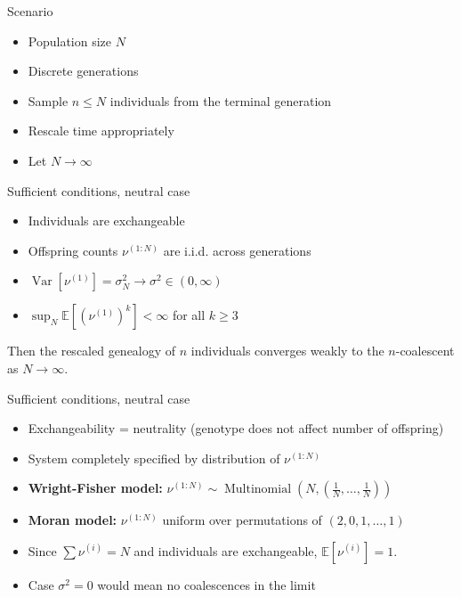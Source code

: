 \documentclass[aspectratio=169]{beamer}
\theoremstyle{definition}
\newcommand{\E}{\mathbb{E}}
\newcommand{\V}{\operatorname{Var}}
\newcommand{\Mn}{\operatorname{Multinomial}}
\begin{document}
\begin{frame}{Scenario}
\begin{itemize}
\item Population size $N$
\item Discrete generations
\item Sample $n \leq N$ individuals from the terminal generation
\item Rescale time appropriately
\item Let $N\to\infty$
\end{itemize}
\end{frame}


\begin{frame}{Sufficient conditions, neutral case}
\begin{theorem}[Kingman 1982]
\begin{itemize}
\item Individuals are exchangeable
\item Offspring counts $\nu^{(1:N)}$ are i.i.d. across generations
\item $\V[ \nu^{(1)} ] = \sigma_N^2 \longrightarrow \sigma^2 \in (0,\infty)$
\item $\sup_N \E[ (\nu^{(1)})^k] <\infty$ for all $k\geq 3$
\end{itemize}
Then the rescaled genealogy of $n$ individuals converges weakly to the $n$-coalescent as $N\to\infty$.
\end{theorem}
\end{frame}


\begin{frame}{Sufficient conditions, neutral case}
\begin{itemize}
\item Exchangeability = neutrality (genotype does not affect number of offspring)
\pause
\item System completely specified by distribution of $\nu^{(1:N)}$
\item \textbf{Wright-Fisher model:} $\nu^{(1:N)} \sim \Mn( N, (\frac{1}{N},\dots, \frac{1}{N}) )$
\item \textbf{Moran model:} $\nu^{(1:N)}$ uniform over permutations of $(2,0,1,\dots, 1)$
\pause
\item Since $\sum \nu^{(i)} = N$ and individuals are exchangeable, $\E[\nu^{(i)}] = 1$.
\item Case $\sigma^2 = 0$ would mean no coalescences in the limit
\end{itemize}
\end{frame}
\end{document}
